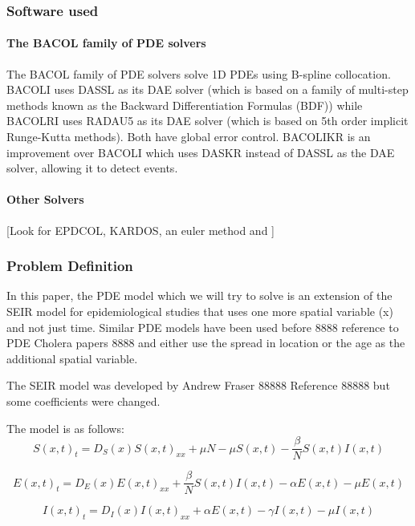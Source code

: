 \documentclass{article}
\begin{document}
\subsubsection{Software used}
\label{subsection:pde_software}
\paragraph{The BACOL family of PDE solvers}
The BACOL family of PDE solvers solve 1D PDEs using B-spline collocation. BACOLI uses DASSL as its DAE solver (which is based on a family of multi-step methods known as the Backward Differentiation Formulas (BDF)) while BACOLRI uses RADAU5 as its DAE solver (which is based on 5th order implicit Runge-Kutta methods). Both have global error control. BACOLIKR is an improvement over BACOLI which uses DASKR instead of DASSL as the DAE solver, allowing it to detect events.

\paragraph{Other Solvers}
[Look for EPDCOL, KARDOS, an euler method and ]


\subsubsection{Problem Definition}
In this paper, the PDE model which we will try to solve is an extension of the SEIR model for epidemiological studies that uses one more spatial variable (x) and not just time. Similar PDE models have been used before 8888 reference to PDE Cholera papers 8888 and either use the spread in location or the age as the additional spatial variable.

The SEIR model was developed by Andrew Fraser 88888 Reference 88888 but some coefficients were changed.

The model is as follows:
\begin{equation}
S(x, t)_t = D_S(x)S(x, t)_{xx} + \mu N - \mu S(x, t) - \frac{\beta}{N}S(x, t) I(x, t)
\end{equation}

\begin{equation}
E(x, t)_t = D_E(x)E(x, t)_{xx} + \frac{\beta}{N}S(x, t)I(x, t) - \alpha E(x, t) - \mu E(x, t)
\end{equation}

\begin{equation}
I(x, t)_t = D_I(x)I(x, t)_{xx} + \alpha E(x, t) - \gamma I(x, t) - \mu I(x, t)
\end{equation}
\end{document}
